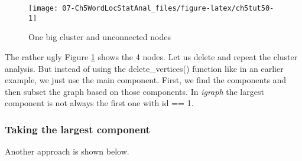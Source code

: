 \documentclass[
]{article}
\newenvironment{Shaded}{\begin{snugshade}}{\end{snugshade}}
\newcommand{\DecValTok}[1]{\textcolor[rgb]{0.00,0.00,0.81}{#1}}
\newcommand{\FunctionTok}[1]{\textcolor[rgb]{0.13,0.29,0.53}{\textbf{#1}}}
\newcommand{\NormalTok}[1]{#1}
\newcommand{\OtherTok}[1]{\textcolor[rgb]{0.56,0.35,0.01}{#1}}
\newcommand{\SpecialCharTok}[1]{\textcolor[rgb]{0.81,0.36,0.00}{\textbf{#1}}}
\begin{document}
\begin{figure}

{\centering \texttt{[image: 07-Ch5WordLocStatAnal\_files/figure-latex/ch5tut50-1]} 

}

\caption{One big cluster and unconnected nodes}\label{fig:ch5tut50}
\end{figure}

The rather ugly Figure \ref{fig:ch5tut50} shows the 4 nodes. Let us delete and repeat the cluster analysis. But instead of using the delete\_vertices() function like in an earlier example, we just use the main component. First, we find the components and then subset the graph based on those components. In \emph{igraph} the largest component is not always the first one with id == 1.

\hypertarget{taking-the-largest-component}{%
\subsubsection{Taking the largest component}\label{taking-the-largest-component}}

\footnotesize

\begin{Shaded}
\end{Shaded}

\normalsize

Another approach is shown below.

\footnotesize

\begin{Shaded}
\end{Shaded}
\end{document}

